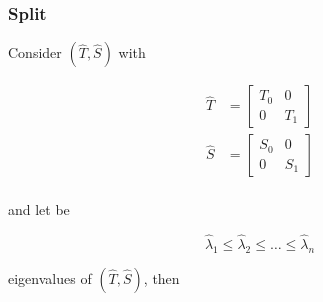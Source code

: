 \documentclass{beamer}
\theoremstyle{definition} \newtheorem{de}{Def}
\theoremstyle{remark} \newtheorem{os}[de]{Oss}
\theoremstyle{plain} \newtheorem{te}[de]{Teo}
\theoremstyle{plain} \newtheorem{co}[de]{Cor}
\theoremstyle{plain} \newtheorem{pr}[de]{Prop}
\theoremstyle{plain} \newtheorem{lem}[de]{Lemm}
\theoremstyle{remark} \newtheorem{rem}[de]{Remark}
\begin{document}
\begin{frame}
\frametitle{Split}

Consider $(\hat T, \hat S)$ with

\begin{align*}
 \hat T &= \begin{bmatrix} T_{0} & 0\\ 0 & T_{1} \end{bmatrix}\\
 \hat S &= \begin{bmatrix} S_{0} & 0\\ 0 & S_{1} \end{bmatrix}\\
\end{align*}

and let be

\begin{equation*}
  \hat\lambda_1 \le \hat\lambda_2 \le \dots \le \hat\lambda_n
\end{equation*}

eigenvalues of $(\hat T, \hat S)$, then

\end{frame}
\end{document}
